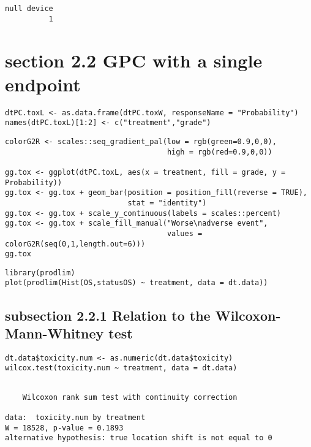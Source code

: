 \documentclass[12pt]{article}
\begin{document}
\begin{verbatim}
null device 
          1
\end{verbatim}
\section{section 2.2 GPC with a single endpoint}
\label{sec:org62d09d2}

\lstset{language=r,label= ,caption= ,captionpos=b,numbers=none}
\begin{lstlisting}
dtPC.toxL <- as.data.frame(dtPC.toxW, responseName = "Probability")
names(dtPC.toxL)[1:2] <- c("treatment","grade")
\end{lstlisting}

\lstset{language=r,label= ,caption= ,captionpos=b,numbers=none}
\begin{lstlisting}
colorG2R <- scales::seq_gradient_pal(low = rgb(green=0.9,0,0),
                                     high = rgb(red=0.9,0,0))

gg.tox <- ggplot(dtPC.toxL, aes(x = treatment, fill = grade, y = Probability))
gg.tox <- gg.tox + geom_bar(position = position_fill(reverse = TRUE),
                            stat = "identity")
gg.tox <- gg.tox + scale_y_continuous(labels = scales::percent)
gg.tox <- gg.tox + scale_fill_manual("Worse\nadverse event",
                                     values = colorG2R(seq(0,1,length.out=6)))
gg.tox 
\end{lstlisting}

\lstset{language=r,label= ,caption= ,captionpos=b,numbers=none}
\begin{lstlisting}
library(prodlim)
plot(prodlim(Hist(OS,statusOS) ~ treatment, data = dt.data))
\end{lstlisting}

\subsection{subsection 2.2.1 Relation to the Wilcoxon-Mann-Whitney test}
\label{sec:org274bb9b}

\lstset{language=r,label= ,caption= ,captionpos=b,numbers=none}
\begin{lstlisting}
dt.data$toxicity.num <- as.numeric(dt.data$toxicity)
wilcox.test(toxicity.num ~ treatment, data = dt.data)
\end{lstlisting}

\begin{verbatim}

	Wilcoxon rank sum test with continuity correction

data:  toxicity.num by treatment
W = 18528, p-value = 0.1893
alternative hypothesis: true location shift is not equal to 0
\end{verbatim}
\end{document}

